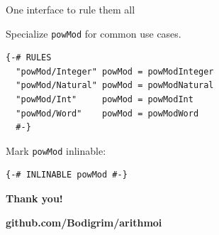 \documentclass[handout]{beamer}
\begin{document}
\begin{frame}[fragile]{One interface to rule them all}

Specialize {\tt powMod} for common use cases.

\begin{lstlisting}
{-# RULES
  "powMod/Integer" powMod = powModInteger
  "powMod/Natural" powMod = powModNatural
  "powMod/Int"     powMod = powModInt
  "powMod/Word"    powMod = powModWord
  #-}
\end{lstlisting}

Mark {\tt powMod} inlinable:

\begin{lstlisting}
{-# INLINABLE powMod #-}
\end{lstlisting}

\end{frame}

\begin{frame}
\centerline{\Huge\bf Thank you!}
\bigskip
\centerline{\huge\bf github.com/Bodigrim/arithmoi}
\end{frame}
\end{document}

